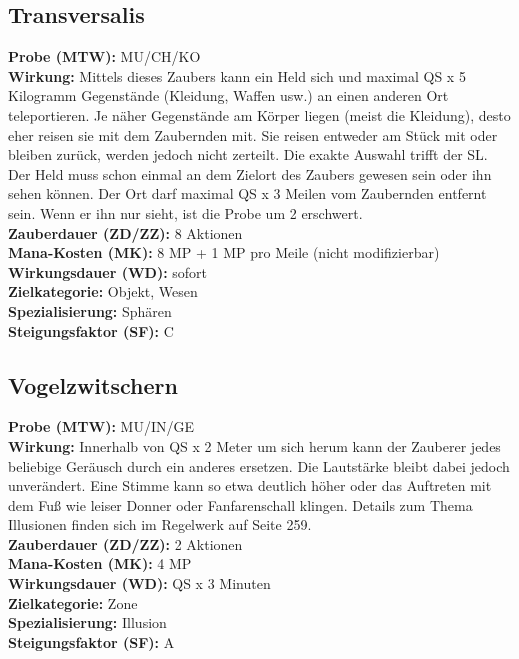 \subsection{Transversalis}
\label{chap:transversalis}
\textbf{Probe (MTW):} MU/CH/KO \\
\textbf{Wirkung:} Mittels dieses Zaubers kann ein Held sich und maximal QS x 5 Kilogramm Gegenstände (Kleidung, Waffen usw.) an einen anderen Ort teleportieren. Je näher Gegenstände am Körper liegen (meist die Kleidung), desto eher reisen sie mit dem Zaubernden mit. Sie reisen entweder am Stück mit oder bleiben zurück, werden jedoch nicht zerteilt. Die exakte Auswahl trifft der SL. Der Held muss schon einmal an dem Zielort des Zaubers gewesen sein oder ihn sehen können. Der Ort darf maximal QS x 3 Meilen vom Zaubernden entfernt sein. Wenn er ihn nur sieht, ist die Probe um 2 erschwert. \\
\textbf{Zauberdauer (ZD/ZZ):} 8 Aktionen \\
\textbf{Mana-Kosten (MK):} 8 MP + 1 MP pro Meile (nicht modifizierbar) \\
\textbf{Wirkungsdauer (WD):} sofort \\
\textbf{Zielkategorie:} Objekt, Wesen \\
\textbf{Spezialisierung:} Sphären \\
\textbf{Steigungsfaktor (SF):} C


\subsection{Vogelzwitschern}
\label{chap:vogelzwitschern}
\textbf{Probe (MTW):} MU/IN/GE \\
\textbf{Wirkung:} Innerhalb von QS x 2 Meter um sich herum kann der Zauberer jedes beliebige Geräusch durch ein anderes ersetzen. Die Lautstärke bleibt dabei jedoch unverändert. Eine Stimme kann so etwa deutlich höher oder das Auftreten mit dem Fuß wie leiser Donner oder Fanfarenschall klingen. Details zum Thema Illusionen finden sich im Regelwerk auf Seite 259.\\
\textbf{Zauberdauer (ZD/ZZ):} 2 Aktionen \\
\textbf{Mana-Kosten (MK):} 4 MP \\
\textbf{Wirkungsdauer (WD):} QS x 3 Minuten \\
\textbf{Zielkategorie:} Zone \\
\textbf{Spezialisierung:} Illusion \\
\textbf{Steigungsfaktor (SF):} A

